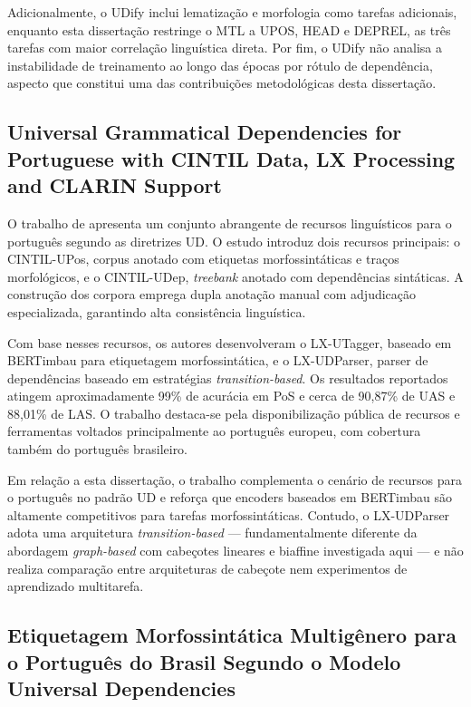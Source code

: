 Adicionalmente, o UDify inclui lematização e morfologia como tarefas adicionais, enquanto
esta dissertação restringe o MTL a UPOS, HEAD e DEPREL, as três tarefas com maior correlação
linguística direta. Por fim, o UDify não analisa a instabilidade de treinamento ao longo das
épocas por rótulo de dependência, aspecto que constitui uma das contribuições metodológicas
desta dissertação.

\subsection*{Universal Grammatical Dependencies for Portuguese with CINTIL Data,
             LX Processing and CLARIN Support}

O trabalho de \citeauthor{branco-etal-2022-universal} apresenta um conjunto abrangente de
recursos linguísticos para o português segundo as diretrizes UD. O estudo introduz dois
recursos principais: o CINTIL-UPos, corpus anotado com etiquetas morfossintáticas e traços
morfológicos, e o CINTIL-UDep, \textit{treebank} anotado com dependências sintáticas.
A construção dos corpora emprega dupla anotação manual com adjudicação especializada,
garantindo alta consistência linguística.

Com base nesses recursos, os autores desenvolveram o LX-UTagger, baseado em BERTimbau para
etiquetagem morfossintática, e o LX-UDParser, parser de dependências baseado em estratégias
\textit{transition-based}. Os resultados reportados atingem aproximadamente 99\% de acurácia
em PoS e cerca de 90,87\% de UAS e 88,01\% de LAS. O trabalho destaca-se pela disponibilização
pública de recursos e ferramentas voltados principalmente ao português europeu, com cobertura
também do português brasileiro.

Em relação a esta dissertação, o trabalho complementa o cenário de recursos para o português
no padrão UD e reforça que encoders baseados em BERTimbau são altamente competitivos para
tarefas morfossintáticas. Contudo, o LX-UDParser adota uma arquitetura \textit{transition-based}
— fundamentalmente diferente da abordagem \textit{graph-based} com cabeçotes lineares e
biaffine investigada aqui — e não realiza comparação entre arquiteturas de cabeçote nem
experimentos de aprendizado multitarefa.

\subsection*{Etiquetagem Morfossintática Multigênero para o Português do Brasil Segundo
             o Modelo Universal Dependencies}


